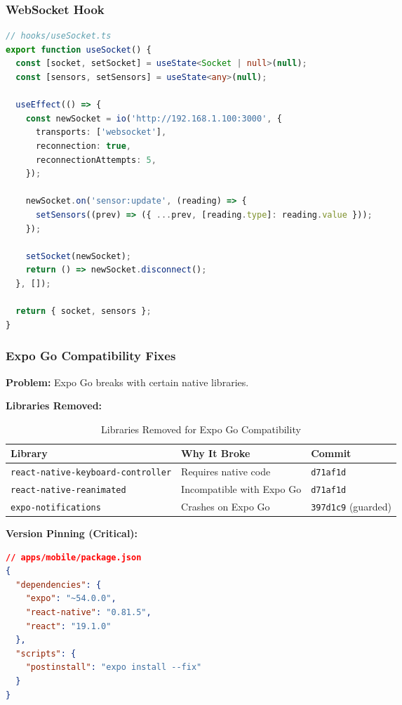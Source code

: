 \documentclass[12pt,a4paper,oneside]{article}
\begin{document}
\subsubsection{WebSocket Hook}
\begin{lstlisting}[language=TypeScript]
// hooks/useSocket.ts
export function useSocket() {
  const [socket, setSocket] = useState<Socket | null>(null);
  const [sensors, setSensors] = useState<any>(null);
  
  useEffect(() => {
    const newSocket = io('http://192.168.1.100:3000', {
      transports: ['websocket'],
      reconnection: true,
      reconnectionAttempts: 5,
    });
    
    newSocket.on('sensor:update', (reading) => {
      setSensors((prev) => ({ ...prev, [reading.type]: reading.value }));
    });
    
    setSocket(newSocket);
    return () => newSocket.disconnect();
  }, []);
  
  return { socket, sensors };
}
\end{lstlisting}

\subsubsection{Expo Go Compatibility Fixes}
\textbf{Problem:} Expo Go breaks with certain native libraries.

\textbf{Libraries Removed:}
\begin{table}[H]
    \centering\small
    \begin{tabularx}{\textwidth}{Xll}
        \toprule
        \textbf{Library} & \textbf{Why It Broke} & \textbf{Commit} \\
        \midrule
        \texttt{react-native-keyboard-controller} & Requires native code & \texttt{d71af1d} \\
        \texttt{react-native-reanimated} & Incompatible with Expo Go & \texttt{d71af1d} \\
        \texttt{expo-notifications} & Crashes on Expo Go & \texttt{397d1c9} (guarded) \\
        \bottomrule
    \end{tabularx}
    \caption{Libraries Removed for Expo Go Compatibility}
\end{table}

\textbf{Version Pinning (Critical):}
\begin{lstlisting}[language=JSON]
// apps/mobile/package.json
{
  "dependencies": {
    "expo": "~54.0.0",
    "react-native": "0.81.5",
    "react": "19.1.0"
  },
  "scripts": {
    "postinstall": "expo install --fix"
  }
}
\end{lstlisting}
\end{document}
